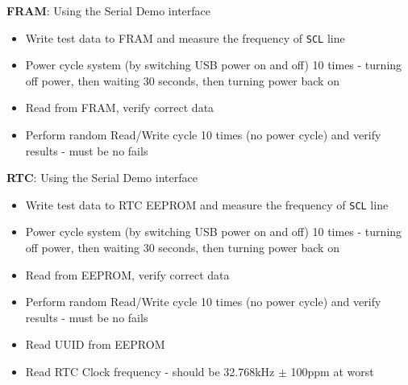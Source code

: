 {\large \textbf{FRAM}:}
Using the Serial Demo interface
\begin{itemize}
\item Write test data to FRAM and measure the frequency of \texttt{SCL} line
\item Power cycle system (by switching USB power on and off) 10 times - turning off power, then waiting 30 seconds, then turning power back on
\item Read from FRAM, verify correct data
\item Perform random Read/Write cycle 10 times (no power cycle) and verify results - must be no fails
\end{itemize}

{\large \textbf{RTC}:}
Using the Serial Demo interface
\begin{itemize}
\item Write test data to RTC EEPROM and measure the frequency of \texttt{SCL} line
\item Power cycle system (by switching USB power on and off) 10 times - turning off power, then waiting 30 seconds, then turning power back on
\item Read from EEPROM, verify correct data 
\item Perform random Read/Write cycle 10 times (no power cycle) and verify results - must be no fails
\item Read UUID from EEPROM
\item Read RTC Clock frequency - should be 32.768kHz $\pm$ 100ppm at worst 
\end{itemize}

